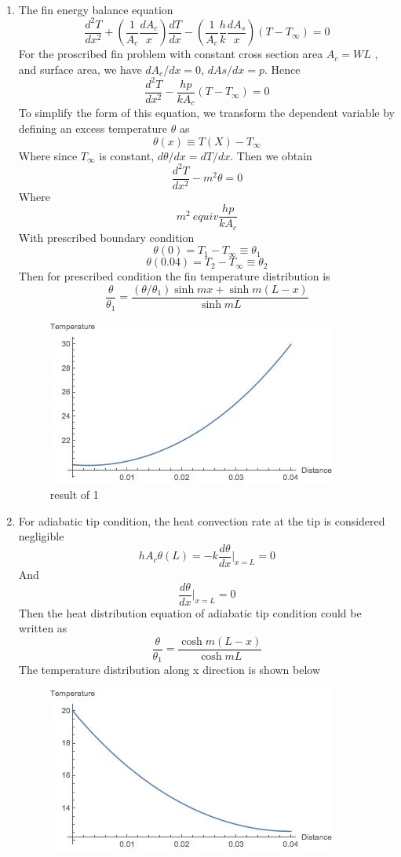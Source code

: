 \begin{solution}
~
\begin{enumerate}
\item
The fin energy balance equation
$$
\frac{d^2 T}{dx^2} + 
\left(\frac{1}{A_c}\frac{dA_c}{x}\right)\frac{dT}{dx}-
\left(\frac{1}{A_c}\frac{h}{k}\frac{dA_s}{x}\right)(T-T_\infty)=0
$$
For the proscribed fin problem with constant cross section area $A_c=WL$ , 
and surface area, we have $dA_c/dx=0$, $dAs/dx=p$. Hence
$$
\frac{d^2 T}{dx^2}-
\frac{hp}{kA_c}(T-T_\infty)=0
$$
To simplify the form of this equation, we transform the dependent variable by 
defining an excess temperature $\theta$ as
$$\theta(x) \equiv T(X)-T_\infty$$
Where since $T_\infty$ is constant, $d\theta/dx=dT/dx$. Then we obtain
$$\frac{d^2 T}{dx^2}-m^2\theta=0$$
Where
$$m^2 \ equiv \frac{hp}{kA_c}$$
With prescribed boundary condition
$$\theta(0)=T_1-T_\infty \equiv \theta_1$$
$$\theta(0.04)=T_2-T_\infty \equiv \theta_2$$
Then for prescribed condition the fin temperature distribution is
$$
\frac{\theta}{\theta_1}=
\frac{(\theta/\theta_1)\sinh mx+\sinh m(L-x)}{\sinh mL}
$$
\begin{figure}[h!]
  \centering
    \includegraphics[scale=0.8]{figures/ch2/13}
    \caption{result of 1}
    \label{fig:2:13}
\end{figure}
\item
For adiabatic tip condition, the heat convection rate at the tip is considered negligible
$$hA_c\theta(L)=-k\frac{d\theta}{dx}|_{x=L}=0$$
And
$$\frac{d\theta}{dx}|_{x=L}=0$$
Then the heat distribution equation of adiabatic tip condition could be written as
$$\frac{\theta}{\theta_1}=
\frac{\cosh m(L-x)}{\cosh mL}
$$
The temperature distribution along x direction is shown below
\begin{figure}[h!]
  \centering
    \includegraphics[scale=0.8]{figures/ch2/14}

\end{figure}
\end{enumerate}
\end{solution}

